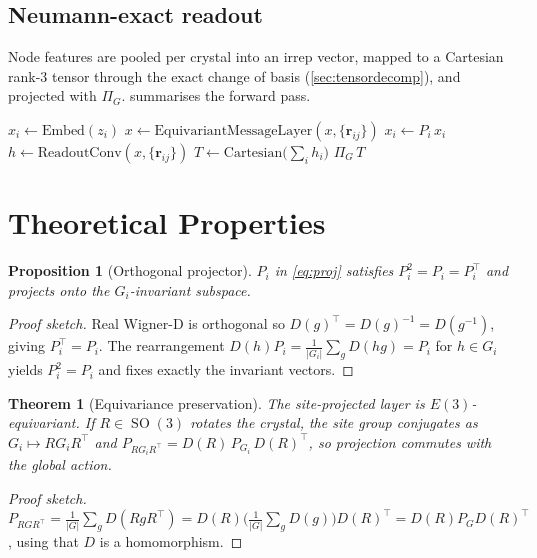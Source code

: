 \documentclass[11pt]{article}
\newtheorem{theorem}{Theorem}
\newtheorem{proposition}{Proposition}
\DeclareMathOperator{\SO}{SO}
\begin{document}
\subsection{Neumann-exact readout}
Node features are pooled per crystal into an irrep vector, mapped to a Cartesian
rank-3 tensor through the exact change of basis (\cref{sec:tensordecomp}), and
projected with $\Pi_G$.  summarises the forward pass.

\begin{algorithm}[t]
\caption{WySGNN forward pass}\label{alg:forward}
\begin{algorithmic}[1]
\State $x_i \gets \text{Embed}(z_i)$
  \State $x \gets \text{EquivariantMessageLayer}(x, \{\bm r_{ij}\})$
  \State $x_i \gets P_i\,x_i$ 
\EndFor
\State $h \gets \text{ReadoutConv}(x, \{\bm r_{ij}\})$ 
\State $T \gets \text{Cartesian}\big(\textstyle\sum_i h_i\big)$
\State \Return $\Pi_G\,T$ 
\end{algorithmic}
\end{algorithm}

\section{Theoretical Properties}
\begin{proposition}[Orthogonal projector]\label{prop:proj}
$P_i$ in \cref{eq:proj} satisfies $P_i^2=P_i=P_i^\top$ and projects onto the
$G_i$-invariant subspace.
\end{proposition}
\begin{proof}[Proof sketch]
Real Wigner-D is orthogonal so $D(g)^\top=D(g)^{-1}=D(g^{-1})$, giving
$P_i^\top=P_i$. The rearrangement $D(h)P_i=\frac1{|G_i|}\sum_g D(hg)=P_i$ for
$h\in G_i$ yields $P_i^2=P_i$ and fixes exactly the invariant vectors.
\end{proof}

\begin{theorem}[Equivariance preservation]\label{thm:equivar}
The site-projected layer is $E(3)$-equivariant. If $R\in\SO(3)$ rotates the
crystal, the site group conjugates as $G_i\mapsto RG_iR^{\top}$ and
$P_{RG_iR^\top}=D(R)\,P_{G_i}\,D(R)^\top$, so projection commutes with the global
action.
\end{theorem}
\begin{proof}[Proof sketch]
$P_{RGR^\top}=\frac1{|G|}\sum_g D(RgR^\top)=D(R)\big(\frac1{|G|}\sum_g
D(g)\big)D(R)^\top=D(R)P_G D(R)^\top$, using that $D$ is a homomorphism.
\end{proof}
\end{document}
